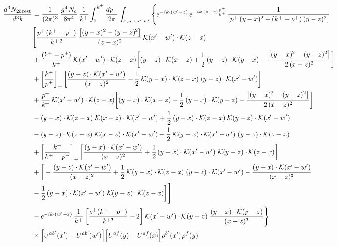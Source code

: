 \documentclass[9pt]{article}
\numberwithin{equation}{section}
\begin{document}
\begin{align}
\frac{d^{3}N_{2b\,\rm rest}}{d^{3}k} & =\frac{1}{(2\pi)^{3}}\,\frac{g^{4}\,N_{c}}{8\pi^{4}}\,\frac{1}{k^{+}}\int_{0}^{k^{+}}\frac{dp^{+}}{2\pi}\int_{x,y,z,x',w'}\Bigg\{e^{-ik\cdot(w'-z)}\,e^{-ik\cdot(z-x)\frac{p^{+}}{k^{+}}}\,\frac{1}{\left[p^{+}\,(y-x)^{2}+(k^{+}-p^{+})\,(y-z)^{2}\right]}\notag \\
& \Bigg[\frac{p^{+}\,(k^{+}-p^{+})}{k^{+\,2}}\,\frac{\left[(y-x)^{2}-(y-z)^{2}\right]}{(z-x)^{2}}\,\mathcal{K}(x'-w')\cdot\mathcal{K}(z-x)\notag \\
& +\frac{(k^{+}-p^{+})}{k^{+}}\,\mathcal{K}(x'-w')\cdot\mathcal{K}(z-x)\bigg[(y-z)\cdot\mathcal{K}(x-z)+\frac{1}{2}\,(y-z)\cdot\mathcal{K}(y-x)-\frac{\left[(y-x)^{2}-(y-z)^{2}\right]}{2\,(x-z)^{2}}\bigg]\notag \\
& +\left[\frac{k^{+}}{p^{+}}\right]_{+}\bigg[\frac{(y-z)\cdot\mathcal{K}(x'-w')}{(x-z)^{2}}-\frac{1}{2}\,\mathcal{K}(y-x)\cdot\mathcal{K}(z-x)\;(y-z)\cdot\mathcal{K}(x'-w')\bigg]\notag \\
& +\frac{p^{+}}{k^{+}}\,\mathcal{K}(x'-w')\cdot\mathcal{K}(z-x)\bigg[(y-x)\cdot\mathcal{K}(x-z)-\frac{1}{2}\,(y-x)\cdot\mathcal{K}(y-z)-\frac{\left[(y-x)^{2}-(y-z)^{2}\right]}{2\,(x-z)^{2}}\bigg]\notag \\
& -(y-x)\cdot\mathcal{K}(z-x)\;\mathcal{K}(x-z)\cdot\mathcal{K}(x'-w')+\frac{1}{2}\,(y-x)\cdot\mathcal{K}(z-x)\;\mathcal{K}(y-z)\cdot\mathcal{K}(x'-w')\notag \\
& -(y-z)\cdot\mathcal{K}(z-x)\;\mathcal{K}(x-z)\cdot\mathcal{K}(x'-w')-\frac{1}{2}\,\mathcal{K}(y-x)\cdot\mathcal{K}(x'-w')\;(y-z)\cdot\mathcal{K}(z-x)\notag \\
& +\left[\frac{k^{+}}{k^{+}-p^{+}}\right]_{+}\bigg[\frac{(y-x)\cdot\mathcal{K}(x'-w')}{(x-z)^{2}}+\frac{1}{2}\,(y-x)\cdot\mathcal{K}(x'-w')\;\mathcal{K}(y-z)\cdot\mathcal{K}(z-x)\bigg]\notag \\
& +\bigg[-\frac{(y-z)\cdot\mathcal{K}(x'-w')}{(x-z)^{2}}+\frac{1}{2}\,\mathcal{K}(y-x)\cdot\mathcal{K}(z-x)\;(y-z)\cdot\mathcal{K}(x'-w')-\frac{(y-x)\cdot\mathcal{K}(x'-w')}{(x-z)^{2}}\notag \\ & -\frac{1}{2}\,(y-x)\cdot\mathcal{K}(x'-w')\;\mathcal{K}(y-z)\cdot\mathcal{K}(z-x)\bigg]\Bigg]\notag \\ & -e^{-ik\cdot(w'-x)}\,\frac{1}{k^{+}}\left[\frac{p^{+}(k^{+}-p^{+})}{k^{+2}}-2\right]\mathcal{K}(x'-w')\cdot\mathcal{K}(y-x)\;\frac{(y-x)\cdot\mathcal{K}(y-z)}{(x-z)^{2}}\Bigg\}\notag\\
&\times\Big[U^{ab'}(x')-U^{ab'}(w')\Big]\Big[U^{af}(y)-U^{af}(x)\Big]\rho^{b'}(x')\,\rho^{f}(y)
\end{align}
\end{document}
